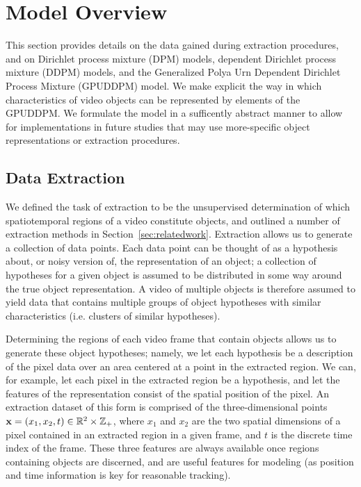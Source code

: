 \documentclass[twocolumn, final]{svjour3}
\begin{document}

\section{Model Overview}
\label{sec:modeloverview}

This section provides details on the data gained during extraction procedures, and on Dirichlet process mixture (DPM) models, dependent Dirichlet process mixture (DDPM) models, and the Generalized Polya Urn Dependent Dirichlet Process Mixture (GPUDDPM) model. We make explicit the way in which characteristics of video objects can be represented by elements of the GPUDDPM. We formulate the model in a sufficently abstract manner to allow for implementations in future studies that may use more-specific object representations or extraction procedures.






\subsection{Data Extraction}
\label{sec:data}

We defined the task of extraction to be the unsupervised determination of which spatiotemporal regions of a video constitute objects, and outlined a number of extraction methods in Section~\ref{sec:relatedwork}. Extraction allows us to generate a collection of data points. Each data point can be thought of as a hypothesis about, or noisy version of, the representation of an object; a collection of hypotheses for a given object is assumed to be distributed in some way around the true object representation. A video of multiple objects is therefore assumed to yield data that contains multiple groups of object hypotheses with similar characteristics (i.e. clusters of similar hypotheses).

Determining the regions of each video frame that contain objects allows us to generate these object hypotheses; namely, we let each hypothesis be a description of the pixel data over an area centered at a point in the extracted region. We can, for example, let each pixel in the extracted region be a hypothesis, and let the features of the representation consist of the spatial position of the pixel. An extraction dataset of this form is comprised of the three-dimensional points $\bold{x} = ( x_{1}, x_{2}, t ) \in \mathbb{R}^{2} \times \mathbb{Z}_{+}$, where $x_{1}$ and $x_{2}$ are the two spatial dimensions of a pixel contained in an extracted region in a given frame, and $t$ is the discrete time index of the frame. These three features are always available once regions containing objects are discerned, and are useful features for modeling (as position and time information is key for reasonable tracking).
\end{document}
